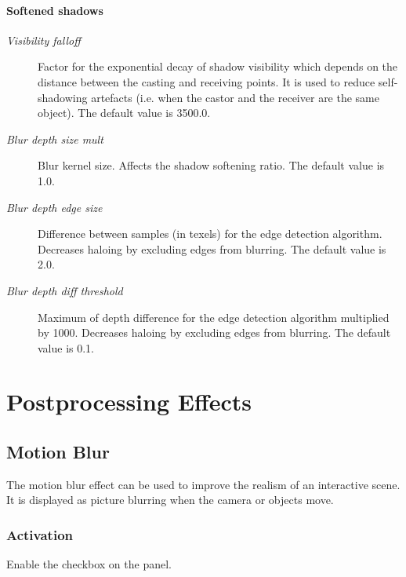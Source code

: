\documentclass[a4paper,12pt,oneside]{sphinxmanual}
\begin{document}
\subsubsection{Softened shadows}
\label{lighting:id12}\begin{description}
\item[{\emph{Visibility falloff}}] \leavevmode
Factor for the exponential decay of shadow visibility which depends on the distance between the casting and receiving points. It is used to reduce self-shadowing artefacts (i.e. when the castor and the receiver are the same object). The default value is 3500.0.

\item[{\emph{Blur depth size mult}}] \leavevmode
Blur kernel size. Affects the shadow softening ratio. The default value is 1.0.

\item[{\emph{Blur depth edge size}}] \leavevmode
Difference between samples (in texels) for the edge detection algorithm. Decreases haloing by excluding edges from blurring. The default value is 2.0.

\item[{\emph{Blur depth diff threshold}}] \leavevmode
Maximum of depth difference for the edge detection algorithm multiplied by 1000. Decreases haloing by excluding edges from blurring. The default value is 0.1.

\end{description}


\chapter{Postprocessing Effects}
\label{postprocessing_effects:postprocessing-effects}\label{postprocessing_effects::doc}\label{postprocessing_effects:id1}

\section{Motion Blur}
\label{postprocessing_effects:id2}\label{postprocessing_effects:motion-blur}\label{postprocessing_effects:index-0}
The motion blur effect can be used to improve the realism of an interactive scene. It is displayed as picture blurring when the camera or objects move.


\subsection{Activation}
\label{postprocessing_effects:id3}
Enable the  checkbox on the  panel.
\end{document}
